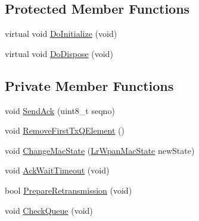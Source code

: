 \subsection*{Protected Member Functions}
\begin{DoxyCompactItemize}
\item 
virtual void \hyperlink{classns3_1_1LrWpanMac_a440e252a3ccf4657a0041499710030dc}{Do\+Initialize} (void)
\item 
virtual void \hyperlink{classns3_1_1LrWpanMac_a055ec667c63440c5f28284a53da9e9e4}{Do\+Dispose} (void)
\end{DoxyCompactItemize}
\subsection*{Private Member Functions}
\begin{DoxyCompactItemize}
\item 
void \hyperlink{classns3_1_1LrWpanMac_afdf2ca2fc6e15fbb1767720607a101f8}{Send\+Ack} (uint8\+\_\+t seqno)
\item 
void \hyperlink{classns3_1_1LrWpanMac_a359da7ecf2f56e4f62f5e8173bf989dd}{Remove\+First\+Tx\+Q\+Element} ()
\item 
void \hyperlink{classns3_1_1LrWpanMac_a9218b72b6b4326ae606de4a74a82ab6d}{Change\+Mac\+State} (\hyperlink{group__lr-wpan_ga02ee7efd682937a8781f5e6101f61884}{Lr\+Wpan\+Mac\+State} new\+State)
\item 
void \hyperlink{classns3_1_1LrWpanMac_ae22b4d0c1d90b75101491f1e74237029}{Ack\+Wait\+Timeout} (void)
\item 
bool \hyperlink{classns3_1_1LrWpanMac_ab13e2a85286df14146410591f378f81d}{Prepare\+Retransmission} (void)
\item 
void \hyperlink{classns3_1_1LrWpanMac_a316c3cc9f84eeadb0b2ca249a6d0caba}{Check\+Queue} (void)
\end{DoxyCompactItemize}

